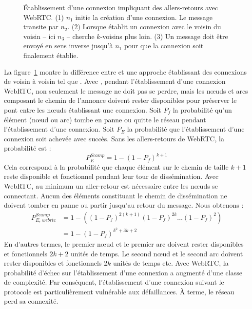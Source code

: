 \begin{figure}
  \begin{center}
    
    \caption[Établissement d'une connexion impliquant des allers-retours avec
    WebRTC]{\label{repl:fig:handshake} Établissement d'une connexion impliquant
      des allers-retours avec WebRTC. (1) $n_1$ initie la création d'une
      connexion. Le message transite par $n_2$. (2) Lorsque \CYCLON établit un
      connexion avec le voisin du voisin -- ici $n_3$ -- \SCAMP cherche
      $k$-voisins plus loin. (3) Un message doit être envoyé en sens inverse
      jusqu'à $n_1$ pour que la connexion soit finalement établie.}
  \end{center}
\end{figure}

\noindent La figure~\ref{repl:fig:handshake} montre la différence entre \SCAMP
et une approche établissant des connexions de voisin à voisin tel que
\CYCLON. Avec \SCAMP, pendant l'établissement d'une connexion WebRTC, non
seulement le message ne doit pas se perdre, mais les nœuds et arcs composant le
chemin de l'annonce doivent rester disponibles pour préserver le pont entre les
nœuds établissant une connexion.  Soit $P_f$ la probabilité qu'un élément (nœud
ou arc) tombe en panne ou quitte le réseau pendant l'établissement d'une
connexion. Soit $P_E$ la probabilité que l'établissement d'une connexion soit
achevée avec succès. Sans les allers-retours de WebRTC, la probabilité est :
\begin{equation} P_{E}^{Scamp}=1-(1- P_f)^{k+1} \end{equation} Cela
correspond à la probabilité que chaque élément sur le chemin de taille $k+1$
reste disponible et fonctionnel pendant leur tour de dissémination. Avec WebRTC,
au minimum un aller-retour est nécessaire entre les nœuds se connectant. Aucun
des éléments constituant le chemin de dissémination ne doivent tomber en panne
ou partir jusqu'au retour du message. Nous obtenons : 
\begin{align} P_{E,\,webrtc}^{Scamp} &=1 - ((1-P_f)^{2(k+1)} (1-P_f)^{2k}
                                     \ldots (1-P_f)^2) \nonumber \\
                                   &=1-(1-P_f)^{k^2+3k+2}
\end{align}
En d'autres termes, le premier nœud et le premier arc doivent rester disponibles
et fonctionnels $2k +2$ unités de temps. Le second nœud et le second arc doivent
rester disponibles et fonctionnels $2k$ unités de temps etc. Avec WebRTC, la
probabilité d'échec sur l'établissement d'une connexion a augmenté d'une classe
de complexité.  Par conséquent, l'établissement d'une connexion suivant le
protocole \SCAMP est particulièrement vulnérable aux défaillances. À terme, le
réseau perd sa connexité.


